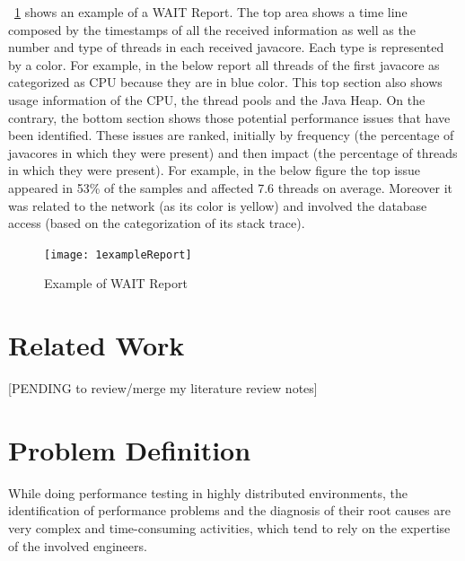 \documentclass[runningheads,a4paper]{llncs}
\begin{document}
\figurename ~\ref{fig_WAITReport} shows an example of a WAIT Report. The top
area shows a time line composed by the timestamps of all the received
information as well as the number and type of threads in each received javacore.
Each type is represented by a color. For example, in the below report all
threads of the first javacore as categorized as CPU because they are in blue
color. This top section also shows usage information of the CPU, the thread
pools and the Java Heap. On the contrary, the bottom section shows those potential
performance issues that have been identified. These issues are ranked, initially
by frequency (the percentage of javacores in which they were present) and then
impact (the percentage of threads in which they were present). For example, in
the below figure the top issue appeared in 53\% of the samples and affected 7.6 threads on average.
Moreover it was related to the network (as its color is yellow) and involved the
database access (based on the categorization of its stack trace).

\begin{figure}[!h]
\texttt{[image: 1exampleReport]}
\caption{Example of WAIT Report}
\label{fig_WAITReport}
\end{figure}


\section{Related Work}

[PENDING to review/merge my literature review notes]



\section{Problem Definition}

While doing performance testing in highly distributed environments, the
identification of performance problems and the diagnosis of their root causes are very complex and time-consuming
activities, which tend to rely on the expertise of the involved engineers.
\end{document}
